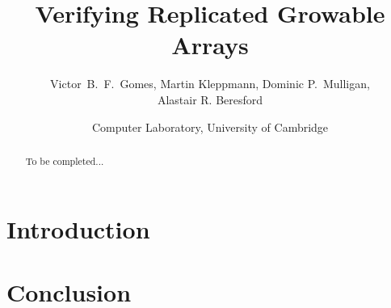 \documentclass[letter,11pt]{article}
\title{Verifying Replicated Growable Arrays}
\author{Victor~B.~F.~Gomes, Martin Kleppmann, Dominic P.~Mulligan,\\Alastair R. Beresford}
\date{Computer Laboratory, University of Cambridge}
\begin{document}
\maketitle

\begin{abstract}
To be completed...
\end{abstract}


\section{Introduction}
\label{sect.introduction}

\section{Conclusion}
\label{sect.conclusion}
\end{document}
